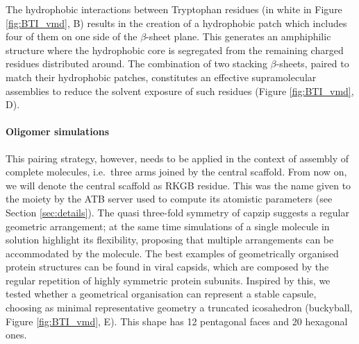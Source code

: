 The hydrophobic interactions between Tryptophan residues (in white in Figure \ref{fig:BTI_vmd}, B) results in the creation of a hydrophobic patch which includes four of them on one side of the $\beta$-sheet plane.
%
This generates an amphiphilic structure where the hydrophobic core is segregated from the remaining charged residues distributed around.
%
The combination of two stacking $\beta$-sheets, paired to match their hydrophobic patches, constitutes an effective supramolecular assemblies to reduce the solvent exposure of such residues (Figure \ref{fig:BTI_vmd}, D).

\paragraph{Oligomer simulations} This pairing strategy, however, needs to be applied in the context of assembly of complete molecules, i.e.\ three arms joined by the central scaffold. From now on, we will denote the central scaffold as RKGB residue. This was the name given to the moiety by the ATB server \citep{Malde2011, Koziara2014} used to compute its atomistic parameters (see Section \ref{sec:details}).
%
The quasi three-fold symmetry of capzip suggests a regular geometric arrangement; at the same time simulations of a single molecule in solution highlight its flexibility, proposing that multiple arrangements can be accommodated by the molecule.
%
The best examples of geometrically organised protein structures can be found in viral capsids, which are composed by the regular repetition of highly symmetric protein subunits.
%
Inspired by this, we tested whether a geometrical organisation can represent a stable capsule, choosing as minimal representative geometry a truncated icosahedron (buckyball, Figure \ref{fig:BTI_vmd}, E). This shape has 12 pentagonal faces and 20 hexagonal ones.

